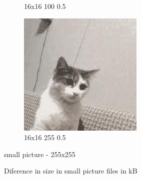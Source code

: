 \documentclass[12pt,a4paper]{article}
\begin{document}
\begin{figure}[H]
\begin{subfigure}{0.25\textwidth}
  \caption{16x16 100 0.5}
  \label{fig:6}
\end{subfigure}\hfil %
\begin{subfigure}{0.25\textwidth}
  \includegraphics[width=\linewidth]{images/small/16-16-255-05}
  \caption{16x16 255 0.5}
  \label{fig:5}
\end{subfigure}


\caption{small picture - 255x255}
\label{fig:images}
\end{figure}

\begin{figure}[H]
    \begin{bchart}[max=150]
            \smallskip
            \smallskip
            \smallskip
            \smallskip
            \smallskip
            \smallskip
            \smallskip
            \smallskip
            \smallskip
            \smallskip
            \smallskip
            \smallskip
    \end{bchart}    
        \caption{Diference in size in small picture files in kB}
    \end{figure}
    
\end{document}

